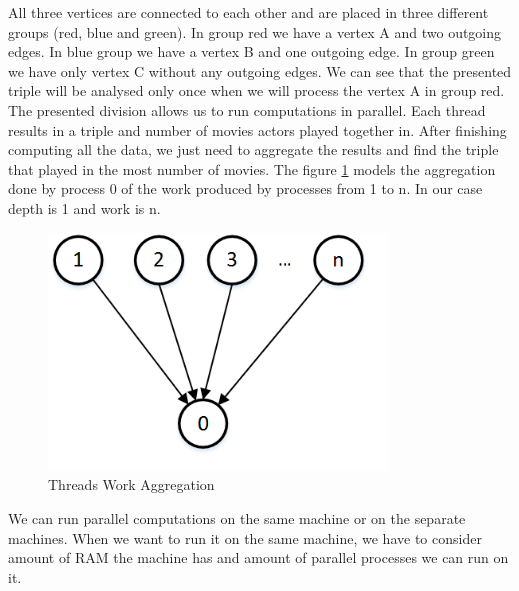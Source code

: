 All three vertices are connected to each other and are placed in three different groups (red, blue and green). In group red we have a vertex A and two outgoing edges. In blue group we have a vertex B and one outgoing edge. In group green we have only vertex C without any outgoing edges. We can see that the presented triple will be analysed only once when we will process the vertex A in group red.
\\
The presented division allows us to run computations in parallel. Each thread results in a triple and number of movies actors played together in. After finishing computing all the data, we just need to aggregate the results and find the triple that played in the most number of movies. The figure \ref{threads} models the aggregation done by process 0 of the work produced by processes from 1 to n. In our case depth is 1 and work is n.


\begin{figure}[ht!]
\centering
\includegraphics[width=90mm]{resources/threads.png}
\caption{Threads Work Aggregation}
\label{threads}
\end{figure}

We can run parallel computations on the same machine or on the separate machines. When we want to run it on the same machine, we have to consider amount of RAM the machine has and amount of parallel processes we can run on it.

